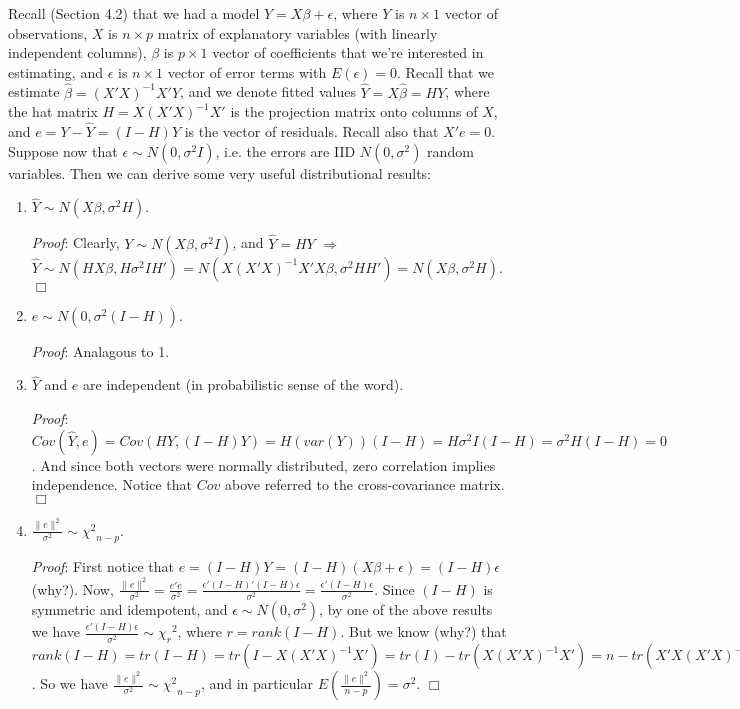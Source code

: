 \documentclass[12pt,oneside]{article}
\begin{document}
Recall (Section 4.2)
that we had a model $Y = X\beta + \epsilon$, where $Y$ is $n \times 1$
vector of observations, $X$ is $n \times p$ matrix of explanatory
variables (with linearly independent columns), $\beta$ is $p \times 1$
vector of coefficients that we're interested in estimating, and
$\epsilon$ is $n \times 1$ vector of error terms with $E(\epsilon) =
0$. Recall that we estimate $\hat{\beta} = (X'X)^{-1}X'Y$, and we
denote fitted values $\hat{Y} = X \hat{\beta} = HY$, where the hat matrix $H=
X(X'X)^{-1}X'$ is the projection matrix onto columns of $X$, and $e =
Y - \hat{Y} = (I-H)Y$ is the vector of residuals. Recall also that
$X'e = 0$. Suppose now that $\epsilon \sim N(0, \sigma^2 I)$, i.e. the
errors are IID $N(0, \sigma^2)$ random variables. Then we can derive
some very useful distributional results:
\begin{enumerate}
\item $\hat{Y} \sim N(X \beta, \sigma^2 H)$.

\emph{Proof}: Clearly, $Y \sim
  N(X \beta, \sigma^2 I)$, and $\hat{Y} = HY$ $\Longrightarrow$
  $\hat{Y} \sim N(HX \beta, H \sigma^2 I H') = N(X(X'X)^{-1}X'X \beta,
  \sigma^2 HH') = N(X \beta, \sigma^2 H)$. $\Box$

\item $e \sim N(0, \sigma^2 (I-H))$.

\emph{Proof}: Analagous to 1.

\item $\hat{Y}$ and $e$ are independent (in probabilistic sense of the
  word).

\emph{Proof}: $Cov(\hat{Y}, e) = Cov(HY, (I-H)Y) = H (var(Y)) (I-H) =
  H \sigma^2 I (I-H) = \sigma^2 H(I-H) = 0$. And since both vectors
  were normally distributed, zero correlation implies
  independence. Notice that $Cov$ above referred to the
  cross-covariance matrix. $\Box$

\item $\frac{\|e\|^2}{\sigma^2} \sim {\chi^2}_{n-p}$.

\emph{Proof}: First
  notice that $e = (I - H)Y = (I - H)(X \beta + \epsilon) =
  (I-H)\epsilon$ (why?). Now, $\frac{\|e\|^2}{\sigma^2} =
  \frac{e'e}{\sigma^2} = \frac{\epsilon' (I-H)'(I-H)
  \epsilon}{\sigma^2} = \frac{\epsilon' (I-H)
  \epsilon}{\sigma^2}$. Since $(I-H)$ is symmetric and idempotent, and
  $\epsilon \sim N(0, \sigma^2)$, by one of the above results we have
  $\frac{\epsilon' (I-H) \epsilon}{\sigma^2} \sim {\chi_r}^2$, where
  $r = rank(I-H)$. But we know (why?) that $rank(I-H) = tr(I-H) = tr(I
  - X(X'X)^{-1}X') = tr(I) - tr(X(X'X)^{-1}X') = n - tr(X'X(X'X)^{-1})
  = n - tr(I_{p \times p}) = n - p$. So we have
  $\frac{\|e\|^2}{\sigma^2} \sim {\chi^2}_{n-p}$, and in particular
  $E(\frac{\|e\|^2}{n-p}) = \sigma^2$.  $\Box$
\end{enumerate}
\end{document}
